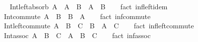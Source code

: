 \begin{isabellebody}
%
\endisadelimproof
\ \isanewline
\isanewline
{}\isamarkupfalse%
\ Int{\isacharunderscore}{\kern0pt}left{\isacharunderscore}{\kern0pt}absorb{\isacharcolon}{\kern0pt}\ {\isachardoublequoteopen}A\ {\isasyminter}\ {\isacharparenleft}{\kern0pt}A\ {\isasyminter}\ B{\isacharparenright}{\kern0pt}\ {\isacharequal}{\kern0pt}\ A\ {\isasyminter}\ B{\isachardoublequoteclose}\isanewline
%
\isadelimproof
\ \ %
\endisadelimproof
%
\isatagproof
{}\isamarkupfalse%
\ {\isacharparenleft}{\kern0pt}fact\ inf{\isacharunderscore}{\kern0pt}left{\isacharunderscore}{\kern0pt}idem{\isacharparenright}{\kern0pt}%
\endisatagproof
{\isafoldproof}%
%
\isadelimproof
\isanewline
%
\endisadelimproof
\isanewline
{}\isamarkupfalse%
\ Int{\isacharunderscore}{\kern0pt}commute{\isacharcolon}{\kern0pt}\ {\isachardoublequoteopen}A\ {\isasyminter}\ B\ {\isacharequal}{\kern0pt}\ B\ {\isasyminter}\ A{\isachardoublequoteclose}\isanewline
%
\isadelimproof
\ \ %
\endisadelimproof
%
\isatagproof
{}\isamarkupfalse%
\ {\isacharparenleft}{\kern0pt}fact\ inf{\isacharunderscore}{\kern0pt}commute{\isacharparenright}{\kern0pt}%
\endisatagproof
{\isafoldproof}%
%
\isadelimproof
\isanewline
%
\endisadelimproof
\isanewline
{}\isamarkupfalse%
\ Int{\isacharunderscore}{\kern0pt}left{\isacharunderscore}{\kern0pt}commute{\isacharcolon}{\kern0pt}\ {\isachardoublequoteopen}A\ {\isasyminter}\ {\isacharparenleft}{\kern0pt}B\ {\isasyminter}\ C{\isacharparenright}{\kern0pt}\ {\isacharequal}{\kern0pt}\ B\ {\isasyminter}\ {\isacharparenleft}{\kern0pt}A\ {\isasyminter}\ C{\isacharparenright}{\kern0pt}{\isachardoublequoteclose}\isanewline
%
\isadelimproof
\ \ %
\endisadelimproof
%
\isatagproof
{}\isamarkupfalse%
\ {\isacharparenleft}{\kern0pt}fact\ inf{\isacharunderscore}{\kern0pt}left{\isacharunderscore}{\kern0pt}commute{\isacharparenright}{\kern0pt}%
\endisatagproof
{\isafoldproof}%
%
\isadelimproof
\isanewline
%
\endisadelimproof
\isanewline
{}\isamarkupfalse%
\ Int{\isacharunderscore}{\kern0pt}assoc{\isacharcolon}{\kern0pt}\ {\isachardoublequoteopen}{\isacharparenleft}{\kern0pt}A\ {\isasyminter}\ B{\isacharparenright}{\kern0pt}\ {\isasyminter}\ C\ {\isacharequal}{\kern0pt}\ A\ {\isasyminter}\ {\isacharparenleft}{\kern0pt}B\ {\isasyminter}\ C{\isacharparenright}{\kern0pt}{\isachardoublequoteclose}\isanewline
%
\isadelimproof
\ \ %
\endisadelimproof
%
\isatagproof
{}\isamarkupfalse%
\ {\isacharparenleft}{\kern0pt}fact\ inf{\isacharunderscore}{\kern0pt}assoc{\isacharparenright}{\kern0pt}%
\endisatagproof
{\isafoldproof}%

\end{isabellebody}
